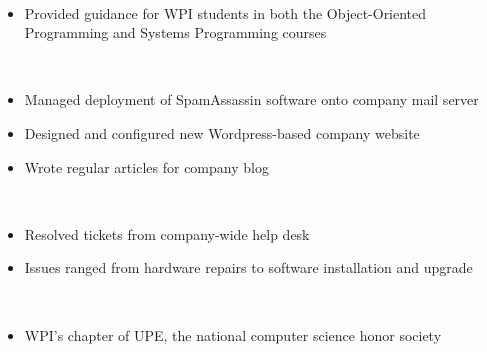 \documentclass[11pt,article,oneside]{memoir}
\begin{document}
\normalsize
\bigskip

\vspace{0.05in}
\\
\vspace{-0.18in}
\footnotesize 
\begin{itemize}
  \item Provided guidance for WPI students in both the Object-Oriented Programming 
    and Systems Programming courses
\end{itemize}
\vspace{-0.075in}

\normalsize
\bigskip

\vspace{0.05in}
\\
\vspace{-0.18in}
\footnotesize 
\begin{itemize}
  \item Managed deployment of SpamAssassin software onto company mail server
  \item Designed and configured new Wordpress-based company website
  \item Wrote regular articles for company blog
\end{itemize}
\vspace{-0.075in}

\normalsize
\bigskip

\vspace{0.05in}
\\
\vspace{-0.18in}
\footnotesize 
\begin{itemize}
  \item Resolved tickets from company-wide help desk
  \item Issues ranged from hardware repairs to software installation and upgrade
\end{itemize}
\vspace{-0.075in}

\bigskip
\normalsize 

\medskip

\vspace{0.05in}
\\
\vspace{-0.18in}
\footnotesize 
\begin{itemize}
  \item WPI's chapter of UPE, the national computer science honor society
\end{itemize}
\vspace{-0.075in}
\end{document}
